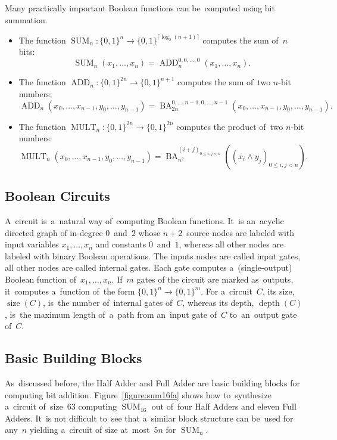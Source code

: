 \documentclass[a4paper, UKenglish, cleveref, autoref,  thm-restate, anonymous]{lipics-v2021}
\DeclareMathOperator{\SUM}{SUM}
\DeclareMathOperator{\ADD}{ADD}
\DeclareMathOperator{\MULT}{MULT}
\DeclareMathOperator{\BA}{BA}
\begin{document}
    Many practically important Boolean functions can be~computed using bit summation.
    \begin{itemize}
        \item The function $\SUM_n \colon \{0,1\}^n \to \{0,1\}^{\lceil \log_2(n+1) \rceil}$
        computes the sum of~$n$ bits: \[\SUM_n(x_1, \dotsc, x_n)=\ADD_n^{0,0,\dotsc,0}(x_1, \dotsc, x_n).\]
        \item The function $\ADD_n \colon \{0,1\}^{2n} \to \{0,1\}^{n+1}$ computes the sum
        of~two $n$-bit numbers:
        \[
            \ADD_n(x_0, \dotsc, x_{n-1}, y_0, \dotsc, y_{n-1})
            =\BA_{2n}^{0,\dotsc,n-1,0,\dotsc,n-1}(x_0, \dotsc, x_{n-1}, y_0, \dotsc, y_{n-1}).
        \]
        \item The function $\MULT_n \colon \{0,1\}^{2n} \to \{0,1\}^{2n}$ computes the product
        of~two $n$-bit numbers:
        \[
            \MULT_n(x_0, \dotsc, x_{n-1}, y_0, \dotsc, y_{n-1})=\BA_{n^2}^{(i+j)_{0 \le i, j < n}}\left(\left(x_i \land y_j\right)_{0 \le i, j < n}\right).
        \]
    \end{itemize}

    \subsection{Boolean Circuits}
    A~circuit is~a~natural way of~computing Boolean functions.
    It~is an~acyclic directed graph of in-degree $0$~and~$2$ whose $n+2$~source
    nodes are labeled with input variables
    $x_1, \dotsc, x_n$ and constants $0$~and~$1$, whereas all other nodes
    are labeled with binary Boolean operations.
    The inputs nodes are called input gates, all other nodes are called internal gates.
    Each gate computes
    a~(single-output) Boolean function of~$x_1, \dotsc, x_n$. If~$m$ gates of the
    circuit are marked as~outputs, it~computes a~function of~the form $\{0,1\}^n \to \{0,1\}^m$.
    For a~circuit~$C$, its size, $\operatorname{size}(C)$,
    is~the number of~internal gates of~$C$,
    whereas its depth, $\operatorname{depth}(C)$,
    is~the maximum length of~a~path
    from an~input gate of~$C$ to~an~output gate of~$C$.


    \subsection{Basic Building Blocks}
    As~discussed before, the Half Adder and Full Adder are basic building
    blocks for computing bit addition. Figure~\ref{figure:sum16fa}
    shows how to~synthesize a~circuit of~size~$63$ computing $\SUM_{16}$
    out of~four Half Adders and eleven Full Adders.
    It~is not difficult to~see that a~similar block structure can
    be~used for any~$n$ yielding a~circuit of size at~most~$5n$ for $\SUM_n$.
\end{document}
